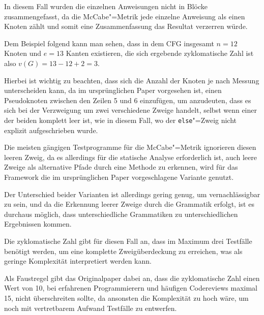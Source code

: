             In diesem Fall wurden die einzelnen Anweisungen nicht in Blöcke zusammengefasst,
            da die McCabe"=Metrik jede einzelne Anweisung als einen Knoten zählt und
            somit eine Zusammenfassung das Resultat verzerren würde.

            Dem Beispiel folgend kann man sehen,
            dass in dem
            \gls{CFG} insgesamt
            \( n = 12 \) Knoten und
            \( e = 13 \) Kanten existieren,
            die sich ergebende zyklomatische Zahl ist also
            \( v(G) = 13 - 12 + 2 = 3 \).

            Hierbei ist wichtig zu beachten,
            dass sich die Anzahl der Knoten je nach Messung unterscheiden kann,
            da im ursprünglichen Paper vorgesehen ist,
            einen Pseudoknoten zwischen den Zeilen 5 und
            6 einzufügen,
            um anzudeuten,
            dass es sich bei der Verzweigung um zwei verschiedene Zweige handelt,
            selbst wenn einer der beiden komplett leer ist,
            wie in diesem Fall,
            wo der
            \lstinline{else}"=Zweig nicht explizit aufgeschrieben wurde.\cite[10]{Watson1996}

            Die meisten gängigen Testprogramme für die McCabe"=Metrik ignorieren diesen leeren Zweig,\cite{Hummel2014}
            da es allerdings für die statische Analyse erforderlich ist,
            auch leere Zweige als alternative Pfade durch eine Methode zu erkennen,
            wird für das Framework die im ursprünglichen Paper vorgeschlagene Variante genutzt.

            Der Unterschied beider Varianten ist allerdings gering genug,
            um vernachlässigbar zu sein,
            und
            da die Erkennung leerer Zweige durch die Grammatik erfolgt,
            ist es durchaus möglich,
            dass unterschiedliche Grammatiken zu unterschiedlichen Ergebnissen kommen.

            Die zyklomatische Zahl gibt für diesen Fall an,
            dass im Maximum drei Testfälle benötigt werden,
            um eine komplette Zweigüberdeckung zu erreichen,
            was als geringe Komplexität interpretiert werden kann.

            Als Faustregel gibt das Originalpaper dabei an,
            dass die zyklomatische Zahl einen Wert von 10,
            bei erfahrenen Programmierern und
            häufigen Codereviews maximal 15,
            nicht überschreiten sollte,
            da ansonsten die Komplexität zu hoch wäre,
            um noch mit vertretbarem Aufwand Testfälle zu entwerfen.\cite[25]{Watson1996}


